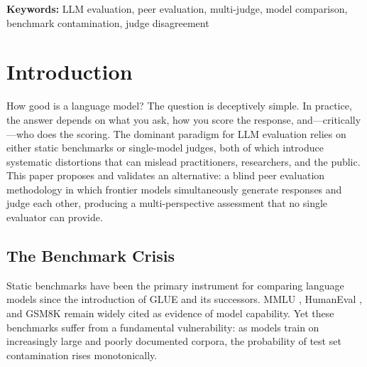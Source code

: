 \documentclass{article}
\begin{document}
\begin{abstract}
systematically favoring them. Third, judge disagreement is category-dependent, with code evaluation producing just over double the disagreement of meta-alignment tasks ($\sigma = 1.27$ vs.\ $0.63$). We release the complete evaluation dataset (27,540 judgments including self-exclusions), an open-source evaluation framework, all question prompts, and a one-command reproduction pipeline under MIT license.
\end{abstract}

\textbf{Keywords:} LLM evaluation, peer evaluation, multi-judge, model comparison, benchmark contamination, judge disagreement

\begin{center}
\end{center}

\section{Introduction}

How good is a language model? The question is deceptively simple. In practice, the answer depends on what you ask, how you score the response, and---critically---who does the scoring. The dominant paradigm for LLM evaluation relies on either static benchmarks or single-model judges, both of which introduce systematic distortions that can mislead practitioners, researchers, and the public. This paper proposes and validates an alternative: a blind peer evaluation methodology in which frontier models simultaneously generate responses and judge each other, producing a multi-perspective assessment that no single evaluator can provide.

\subsection{The Benchmark Crisis}

Static benchmarks have been the primary instrument for comparing language models since the introduction of GLUE \citep{wang2019glue} and its successors. MMLU \citep{hendrycks2021measuring}, HumanEval \citep{chen2021evaluating}, and GSM8K \citep{cobbe2021training} remain widely cited as evidence of model capability. Yet these benchmarks suffer from a fundamental vulnerability: as models train on increasingly large and poorly documented corpora, the probability of test set contamination rises monotonically.
\end{document}
